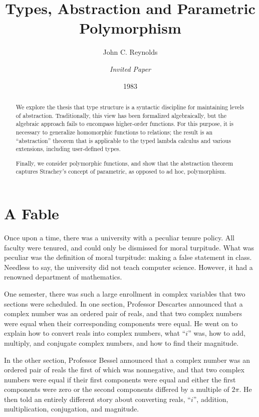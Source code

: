\documentclass[sigplan,screen,nonacm,balance=false]{acmart}
\title{\vspace{0.5\baselineskip}Types, Abstraction and Parametric Polymorphism}
\date{1983}
\author{John C. Reynolds}
\affiliation{
  \institution{Syracuse University}
  \city{Syracuse}
  \state{New York}
  \country{USA}
}
\author{\null\hfill\textit{Invited Paper}} %
\theoremstyle{plain}
\begin{document}
\fancyhf{}
\fancyhead[RO]{\thepage}
\fancyhead[LE]{\thepage}

\maketitle
\thispagestyle{first}

\begin{abstract}
  We explore the thesis that type structure is a syntactic discipline for maintaining levels of abstraction.
  Traditionally, this view has been formalized algebraically, but the algebraic approach fails to encompass higher-order functions.
  For this purpose, it is necessary to generalize homomorphic functions to relations;
  the result is an ``abstraction'' theorem that is applicable to the typed lambda calculus and various extensions, including user-defined types.

  Finally, we consider polymorphic functions, and show that the abstraction theorem captures Strachey's concept of parametric, as opposed to ad hoc, polymorphism.
\end{abstract}

\section{A Fable}

Once upon a time, there was a university with a peculiar tenure policy.
All faculty were tenured, and could only be dismissed for moral turpitude.
What was peculiar was the definition of moral turpitude:
making a false statement in class.
Needless to say, the university did not teach computer science.
However, it had a renowned department of mathematics.

One semester, there was such a large enrollment in complex variables that two sections were scheduled.
In one section, Professor Descartes announced that a complex number was an ordered pair of reals, and that two complex numbers were equal when their corresponding components were equal.
He went on to explain how to convert reals into complex numbers, what ``$i$'' was, how to add, multiply, and conjugate complex numbers, and how to find their magnitude.

In the other section, Professor Bessel announced that a complex number was an ordered pair of reals the first of which was nonnegative, and that two complex numbers were equal if their first components were equal and either the first components were zero or the second components differed by a multiple of $2\pi$.
He then told an entirely different story about converting reals, ``$i$'', addition, multiplication, conjugation, and magnitude.
\end{document}
